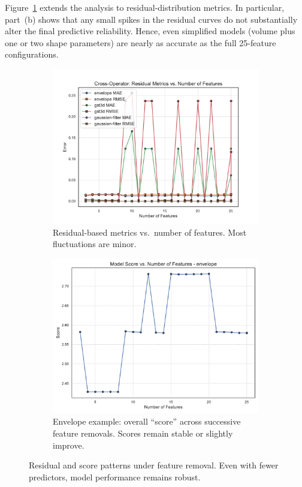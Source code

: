 Figure~\ref{fig:feature_selection_overview_part2} extends the analysis to residual-distribution metrics.
In particular, part~(b) shows that any small spikes in the residual curves do not substantially alter the final predictive reliability.
Hence, even simplified models (volume plus one or two shape parameters) are nearly as accurate as the full 25-feature configurations.

\begin{figure}[htbp]
    \centering
    \begin{subfigure}[t]{0.49\textwidth}
        \includegraphics[width=\textwidth]{assets/images/05/residual_metrics_by_number_of_features}
        \caption{Residual-based metrics vs.\ number of features.
        Most fluctuations are minor.}
    \end{subfigure}
    \hfill
    \begin{subfigure}[t]{0.49\textwidth}
        \includegraphics[width=\textwidth]{assets/images/05/score_by_number_of_features_envelope}
        \caption{Envelope example: overall “score” across successive feature removals.
        Scores remain stable or slightly improve.}
    \end{subfigure}
    \caption{Residual and score patterns under feature removal.
    Even with fewer predictors, model performance remains robust.}
    \label{fig:feature_selection_overview_part2}
\end{figure}

